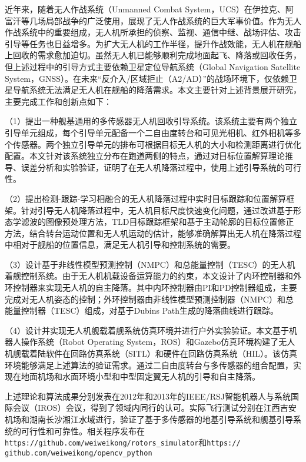 \begin{cabstract}
近年来，随着无人作战系统（Unmanned Combat System，UCS）在伊拉克、阿富汗等几场局部战争的广泛使用，展现了无人作战系统的巨大军事价值。作为无人作战系统中的重要组成，无人机所承担的侦察、监视、通信中继、战场评估、攻击引导等任务也日益增多。为扩大无人机的工作半径，提升作战效能，无人机在舰船上回收的需求愈加迫切。虽然无人机已能够顺利完成地面起飞、降落或回收任务，但上述过程中的引导方式主要依赖卫星定位导航系统（Global Navigation Satellite System，GNSS）。在未来“反介入/区域拒止（A2/AD）”的战场环境下，仅依赖卫星导航系统无法满足无人机在舰船的降落需求。本文主要针对上述背景展开研究，主要完成工作和创新点如下：

（1）提出一种舰基通用的多传感器无人机回收引导系统。该系统主要有两个独立引导单元组成，每个引导单元配备一个二自由度转台和可见光相机、红外相机等多个传感器。两个独立引导单元的排布可根据目标无人机的大小和检测距离进行优化配置。本文针对该系统独立分布在跑道两侧的特点，通过对目标位置解算理论推导、误差分析和实验验证，证明了在无人机降落过程中，使用上述引导系统的可行性。

（2）提出检测-跟踪-学习相融合的无人机降落过程中实时目标跟踪和位置解算框架。针对引导无人机降落过程中，无人机目标尺度快速变化问题，通过改进基于形态学滤波的图像预处理方法，TLD目标跟踪框架和基于主动轮廓的目标位置修正方法，结合转台运动位置和无人机运动的估计，能够准确解算出无人机在降落过程中相对于舰船的位置信息，满足无人机引导和控制系统的需要。

（3）设计基于非线性模型预测控制（NMPC）和总能量控制（TESC）的无人机着舰控制系统。由于无人机机载设备运算能力的约束，本文设计了内环控制器和外环控制器来实现无人机的自主降落。其中内环控制器由PI和PD控制器组成，主要完成对无人机姿态的控制；外环控制器由非线性模型预测控制器（NMPC）和总能量控制器（TESC）组成，对基于Dubins Path生成的降落曲线进行跟踪。

（4）设计并实现无人机舰载着舰系统仿真环境并进行户外实验验证。本文基于机器人操作系统（Robot Operating System，ROS）和Gazebo仿真环境构建了无人机舰载着陆软件在回路仿真系统（SITL）和硬件在回路仿真系统（HIL）。该仿真环境能够满足上述算法的验证需求。通过二自由度转台与多传感器的组合配置，实现在地面机场和水面环境小型和中型固定翼无人机的引导和自主降落。

上述理论和算法成果分别发表在2012年和2013年的IEEE/RSJ智能机器人与系统国际会议（IROS）会议，得到了领域内同行的认可。实际飞行测试分别在江西吉安机场和湖南长沙湘江水域进行，验证了基于多传感器的地基引导系统和舰基引导系统的可行性和可靠性。相关程序发布在\texttt{https://github.com/weiweikong/rotors\_simulator}和\texttt{https://\\github.com/weiweikong/opencv\_python}

\end{cabstract}

